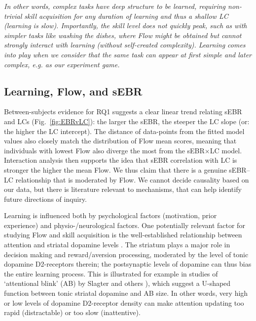 \documentclass[10pt,letterpaper,floatsintext]{article}
\begin{document}
{\it In other words, complex tasks have deep structure to be learned, requiring non-trivial skill acquisition for any duration of learning and thus a shallow LC (learning is slow). Importantly, the skill level does not quickly peak, such as with simpler tasks like washing the dishes, where Flow might be obtained but cannot strongly interact with learning (without self-created complexity). Learning comes into play when we consider that the same task can appear at first simple and later complex, e.g. as our experiment game.}

\subsection*{Learning, Flow, and sEBR}
Between-subjects evidence for RQ1 suggests a clear linear trend relating sEBR and LCs (Fig.~\ref{fig:EBRvLC}): the larger the sEBR, the steeper the LC slope (or: the higher the LC intercept). The distance of data-points from the fitted model values also closely match the distribution of Flow mean scores, meaning that individuals with lowest Flow also diverge the most from the sEBR$\times$LC model. Interaction analysis then supports the idea that sEBR correlation with LC is stronger the higher the mean Flow. We thus claim that there is a genuine sEBR--LC relationship that is moderated by Flow. We cannot decide causality based on our data, but there is literature relevant to mechanisms, that can help identify future directions of inquiry.

Learning is influenced both by psychological factors (motivation, prior experience) and physio-/neurological factors. One potentially relevant factor for studying Flow and skill acquisition is the well-established relationship between attention and striatal dopamine levels \cite{Dreisbach2005}. The striatum plays a major role in decision making and reward/aversion processing, moderated by the level of tonic dopamine D2-receptors therein; the postsynaptic levels of dopamine can thus bias the entire learning process. This is illustrated for example in studies of `attentional blink' (AB) by Slagter and others \cite{Slagter2012,COLZATO2008}), which suggest a U-shaped function between tonic striatal dopamine and AB size. In other words, very high or low levels of dopamine D2-receptor density can make attention updating too rapid (distractable) or too slow (inattentive).
\end{document}
